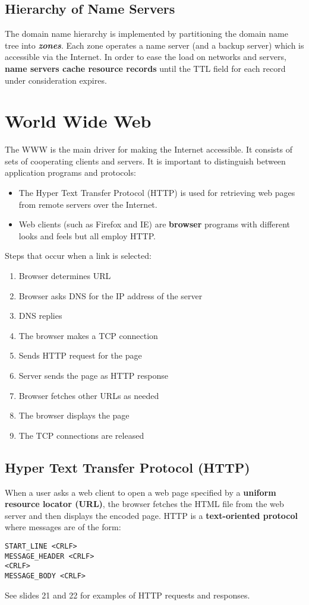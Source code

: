 \documentclass[11pt]{article}
\begin{document}
\subsection{Hierarchy of Name Servers}
\label{sec:org0a08db8}
The domain name hierarchy is implemented by partitioning the domain name tree into \textbf{\emph{zones}}.
Each zone operates a name server (and a backup server) which is accessible via the Internet.
In order to ease the load on networks and servers, \textbf{name servers cache resource records} until the TTL field for each record under consideration expires.

\section{World Wide Web}
\label{sec:org9485c2f}
The WWW is the main driver for making the Internet accessible.
It consists of sets of cooperating clients and servers.
It is important to distinguish between application programs and protocols:
\begin{itemize}
\item The Hyper Text Transfer Protocol (HTTP) is used for retrieving web pages from remote servers over the Internet.
\item Web clients (such as Firefox and IE) are \textbf{browser} programs with different looks and feels but all employ HTTP.
\end{itemize}
Steps that occur when a link is selected:
\begin{enumerate}
\item Browser determines URL
\item Browser asks DNS for the IP address of the server
\item DNS replies
\item The browser makes a TCP connection
\item Sends HTTP request for the page
\item Server sends the page as HTTP response
\item Browser fetches other URLs as needed
\item The browser displays the page
\item The TCP connections are released
\end{enumerate}

\subsection{Hyper Text Transfer Protocol (HTTP)}
\label{sec:org2e25f84}
When a user asks a web client to open a web page specified by a \textbf{uniform resource locator (URL)}, the browser fetches the HTML file from the web server and then displays the encoded page.
HTTP is a \textbf{text-oriented protocol} where messages are of the form:
\begin{verbatim}
START_LINE <CRLF>
MESSAGE_HEADER <CRLF>
<CRLF>
MESSAGE_BODY <CRLF>
\end{verbatim}
See slides 21 and 22 for examples of HTTP requests and responses.
\end{document}
